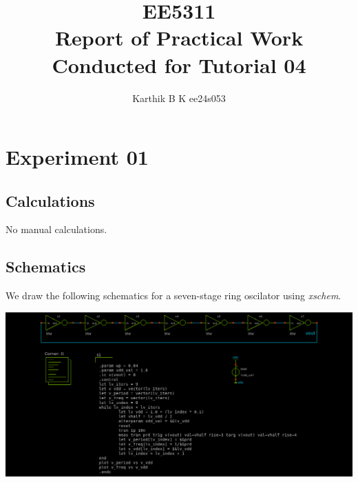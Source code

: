 \documentclass[12pt,a4paper]{article}
\begin{document}
\title{EE5311 \\ Report of Practical Work Conducted for Tutorial 04}
\author{Karthik B K ee24s053}
\maketitle

\section{Experiment 01}
\subsection{Calculations}
\noindent No manual calculations.

\subsection{Schematics}
\noindent We draw the following schematics for a seven-stage ring oscilator using \emph{xschem}.
\begin{center}
\includegraphics[width=0.99\linewidth]{tut4/expt1/ro7.sch.png}
\end{center}
\end{document}
